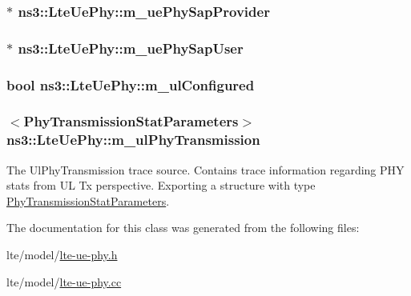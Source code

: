 \subsubsection[{\texorpdfstring{m\+\_\+ue\+Phy\+Sap\+Provider}{m_uePhySapProvider}}]{$\ast$ ns3\+::\+Lte\+Ue\+Phy\+::m\+\_\+ue\+Phy\+Sap\+Provider\hspace{0.3cm}{\ttfamily [private]}}\hypertarget{classns3_1_1LteUePhy_a442bf9889ffb79723923619d182117e4}{}\label{classns3_1_1LteUePhy_a442bf9889ffb79723923619d182117e4}
\subsubsection[{\texorpdfstring{m\+\_\+ue\+Phy\+Sap\+User}{m_uePhySapUser}}]{$\ast$ ns3\+::\+Lte\+Ue\+Phy\+::m\+\_\+ue\+Phy\+Sap\+User\hspace{0.3cm}{\ttfamily [private]}}\hypertarget{classns3_1_1LteUePhy_a18ef57afea937e2e4bcc5b87bfd6ae68}{}\label{classns3_1_1LteUePhy_a18ef57afea937e2e4bcc5b87bfd6ae68}
\subsubsection[{\texorpdfstring{m\+\_\+ul\+Configured}{m_ulConfigured}}]{\setlength{\rightskip}{0pt plus 5cm}bool ns3\+::\+Lte\+Ue\+Phy\+::m\+\_\+ul\+Configured\hspace{0.3cm}{\ttfamily [private]}}\hypertarget{classns3_1_1LteUePhy_ac90075a25fb13b52d70c1937cf83dd56}{}\label{classns3_1_1LteUePhy_ac90075a25fb13b52d70c1937cf83dd56}
\subsubsection[{\texorpdfstring{m\+\_\+ul\+Phy\+Transmission}{m_ulPhyTransmission}}]{$<${\bf Phy\+Transmission\+Stat\+Parameters}$>$ ns3\+::\+Lte\+Ue\+Phy\+::m\+\_\+ul\+Phy\+Transmission\hspace{0.3cm}{\ttfamily [private]}}\hypertarget{classns3_1_1LteUePhy_ac202a6c628e4657e46db7746728b1162}{}\label{classns3_1_1LteUePhy_ac202a6c628e4657e46db7746728b1162}
The {\ttfamily Ul\+Phy\+Transmission} trace source. Contains trace information regarding P\+HY stats from UL Tx perspective. Exporting a structure with type \hyperlink{structns3_1_1PhyTransmissionStatParameters}{Phy\+Transmission\+Stat\+Parameters}. 

The documentation for this class was generated from the following files\+:\begin{DoxyCompactItemize}
\item 
lte/model/\hyperlink{lte-ue-phy_8h}{lte-\/ue-\/phy.\+h}\item 
lte/model/\hyperlink{lte-ue-phy_8cc}{lte-\/ue-\/phy.\+cc}\end{DoxyCompactItemize}
